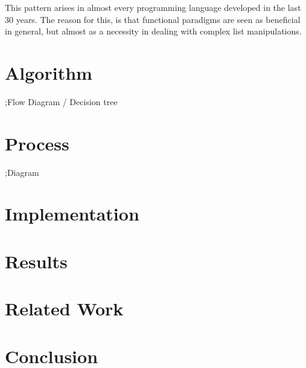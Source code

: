 \documentclass{article}
\begin{document}
This pattern arises in almost every programming language developed in the last 30 years.  The reason for this, is that functional paradigms are seen as beneficial in general, but almost as a necessity in dealing with complex list manipulations.    

\section{Algorithm}

;Flow Diagram / Decision tree

\section{Process}

;Diagram

\section{Implementation}

\section{Results}

\section{Related Work}

\section{Conclusion}
\end{document}
